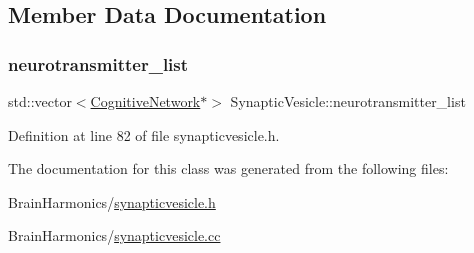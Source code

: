 \subsection{Member Data Documentation}
\mbox{\label{class_synaptic_vesicle_a6b7fb63806105b89ddad8fd0f56b76f6}} 
\subsubsection{\texorpdfstring{neurotransmitter\+\_\+list}{neurotransmitter\_list}}
{\footnotesize\ttfamily std\+::vector$<$\mbox{\hyperlink{class_cognitive_network}{Cognitive\+Network}}$\ast$$>$ Synaptic\+Vesicle\+::neurotransmitter\+\_\+list\hspace{0.3cm}{\ttfamily [protected]}}



Definition at line 82 of file synapticvesicle.\+h.



The documentation for this class was generated from the following files\+:\begin{DoxyCompactItemize}
\item 
Brain\+Harmonics/\mbox{\hyperlink{synapticvesicle_8h}{synapticvesicle.\+h}}\item 
Brain\+Harmonics/\mbox{\hyperlink{synapticvesicle_8cc}{synapticvesicle.\+cc}}\end{DoxyCompactItemize}
